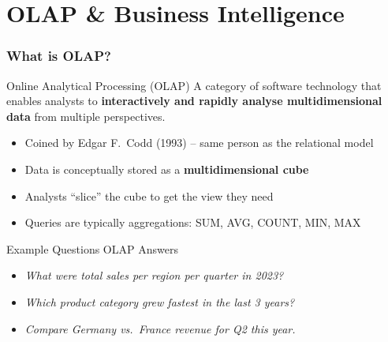 \section{OLAP \& Business Intelligence}


\begin{frame}
  \frametitle{What is OLAP?}

  \begin{block}{Online Analytical Processing (OLAP)}
    A category of software technology that enables analysts to
    \textbf{interactively and rapidly analyse multidimensional data}
    from multiple perspectives.
  \end{block}

  \begin{itemize}
    \item Coined by Edgar F.\ Codd (1993) -- same person as the relational model
    \item Data is conceptually stored as a \textbf{multidimensional cube}
    \item Analysts ``slice'' the cube to get the view they need
    \item Queries are typically aggregations: SUM, AVG, COUNT, MIN, MAX
  \end{itemize}

  \begin{examples}{Example Questions OLAP Answers}
    \begin{itemize}
      \item \textit{What were total sales per region per quarter in 2023?}
      \item \textit{Which product category grew fastest in the last 3 years?}
      \item \textit{Compare Germany vs.\ France revenue for Q2 this year.}
    \end{itemize}
  \end{examples}

\end{frame}

